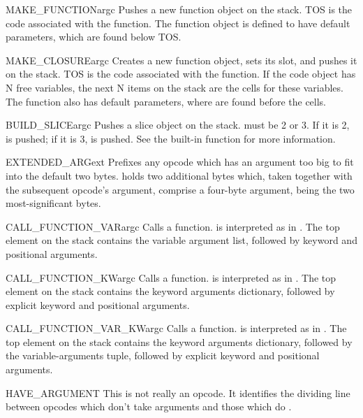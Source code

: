 \begin{opcodedesc}{MAKE_FUNCTION}{argc}
Pushes a new function object on the stack.  TOS is the code associated
with the function.  The function object is defined to have 
default parameters, which are found below TOS.
\end{opcodedesc}

\begin{opcodedesc}{MAKE_CLOSURE}{argc}
Creates a new function object, sets its  slot, and
pushes it on the stack.  TOS is the code associated with the function.
If the code object has N free variables, the next N items on the stack
are the cells for these variables.  The function also has 
default parameters, where are found before the cells.
\end{opcodedesc}

\begin{opcodedesc}{BUILD_SLICE}{argc}
Pushes a slice object on the stack.   must be 2 or 3.  If it
is 2,  is pushed; if it is 3,
 is pushed.
See the  built-in function for more
information.
\end{opcodedesc}

\begin{opcodedesc}{EXTENDED_ARG}{ext}
Prefixes any opcode which has an argument too big to fit into the
default two bytes.   holds two additional bytes which, taken
together with the subsequent opcode's argument, comprise a four-byte
argument,  being the two most-significant bytes.
\end{opcodedesc}

\begin{opcodedesc}{CALL_FUNCTION_VAR}{argc}
Calls a function.  is interpreted as in .
The top element on the stack contains the variable argument list, followed
by keyword and positional arguments.
\end{opcodedesc}

\begin{opcodedesc}{CALL_FUNCTION_KW}{argc}
Calls a function.  is interpreted as in .
The top element on the stack contains the keyword arguments dictionary, 
followed by explicit keyword and positional arguments.
\end{opcodedesc}

\begin{opcodedesc}{CALL_FUNCTION_VAR_KW}{argc}
Calls a function.  is interpreted as in
.  The top element on the stack contains the
keyword arguments dictionary, followed by the variable-arguments
tuple, followed by explicit keyword and positional arguments.
\end{opcodedesc}

\begin{opcodedesc}{HAVE_ARGUMENT}{}
This is not really an opcode.  It identifies the dividing line between
opcodes which don't take arguments  and those which do
.
\end{opcodedesc}
